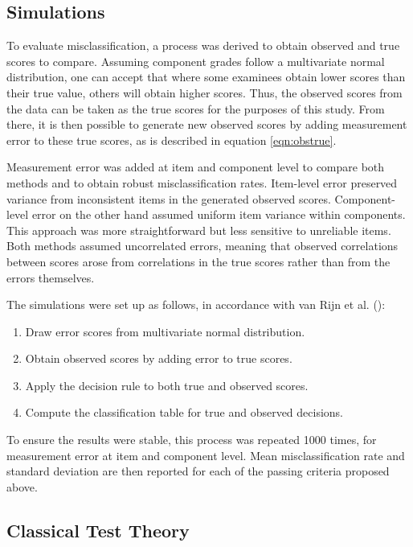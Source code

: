 \documentclass[12pt]{article}
\begin{document}
\subsection{Simulations}

To evaluate misclassification, a process was derived to obtain observed and true scores to compare. Assuming component grades follow a multivariate normal distribution, one can accept that where some examinees obtain lower scores than their true value, others will obtain higher scores. Thus, the observed scores from the data can be taken as the true scores for the purposes of this study. From there, it is then possible to generate new observed scores by adding measurement error to these true scores, as is described in equation \ref{eqn:obstrue}. 

Measurement error was added at item and component level to compare both methods and to obtain robust misclassification rates. Item-level error preserved variance from inconsistent items in the generated observed scores. Component-level error on the other hand assumed uniform item variance within components. This approach was more straightforward but less sensitive to unreliable items. Both methods assumed uncorrelated errors, meaning that observed correlations between scores arose from correlations in the true scores rather than from the errors themselves.

The simulations were set up as follows, in accordance with van Rijn et al. (\cite*{rijnEducationalMeasurementIssues2014}):

\begin{enumerate}[itemsep=0pt, parsep=0pt]
    \item Draw error scores from multivariate normal distribution.
    \item Obtain observed scores by adding error to true scores.
    \item Apply the decision rule to both true and observed scores.
    \item Compute the classification table for true and observed decisions.
\end{enumerate}

To ensure the results were stable, this process was repeated 1000 times, for measurement error at item and component level. Mean misclassification rate and standard deviation are then reported for each of the passing criteria proposed above.

\subsection{Classical Test Theory} \label{CTT}
\end{document}
